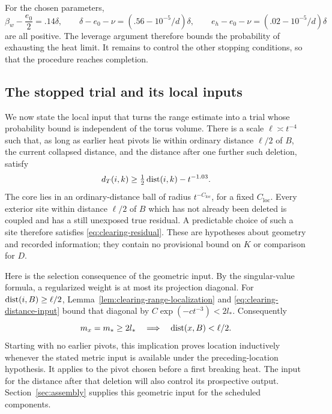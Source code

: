 For the chosen parameters,
\[
 \beta_w-\frac{e_0}{2}=.14\delta,\qquad
 \delta-e_0-\nu=(.56-10^{-5}/d)\delta,\qquad
 e_h-e_0-\nu=(.02-10^{-5}/d)\delta
\]
are all positive.  The leverage argument therefore bounds the
probability of exhausting the heat limit.  It remains to control the
other stopping conditions, so that the procedure reaches completion.

\subsection{The stopped trial and its local inputs}

We now state the local input that turns the range estimate into a trial
whose probability bound is independent of the torus volume. There is a
scale $\ell\asymp t^{-4}$ such that, as long as earlier heat pivots lie
within ordinary distance $\ell/2$ of $B$, the current collapsed distance,
and the distance after one further such deletion, satisfy
\begin{equation}\label{eq:clearing-distance-input}
 d_T(i,k)\ge\tfrac12\operatorname{dist}(i,k)-t^{-1.03}.
\end{equation}
The core lies in an ordinary-distance ball of radius $t^{-C_{\mathrm{loc}}}$,
for a fixed $C_{\mathrm{loc}}$. Every exterior site within distance
$\ell/2$ of $B$ which has not already been deleted is coupled and has a still
unexposed true residual. A predictable choice of such a site therefore
satisfies \eqref{eq:clearing-residual}. These are hypotheses about geometry
and recorded information; they contain no provisional bound on $K$ or
comparison for $D$.

Here is the selection consequence of the geometric input. By the
singular-value formula, a regularized weight is at most its projection
diagonal. For $\operatorname{dist}(i,B)\ge\ell/2$, Lemma~\ref{lem:clearing-range-localization}
and \eqref{eq:clearing-distance-input} bound that diagonal by
$C\exp(-ct^{-3})<2l_*$. Consequently
\begin{equation}\label{eq:clearing-proposed-location}
 m_x=m_*\ge2l_*\quad\Longrightarrow\quad \operatorname{dist}(x,B)<\ell/2.
\end{equation}
Starting with no earlier pivots, this implication proves location
inductively whenever the stated metric input is available under the
preceding-location hypothesis. It applies to the pivot chosen before a
first breaking heat. The input for the distance after that deletion will
also control its prospective output. Section~\ref{sec:assembly} supplies
this geometric input for the scheduled components.

